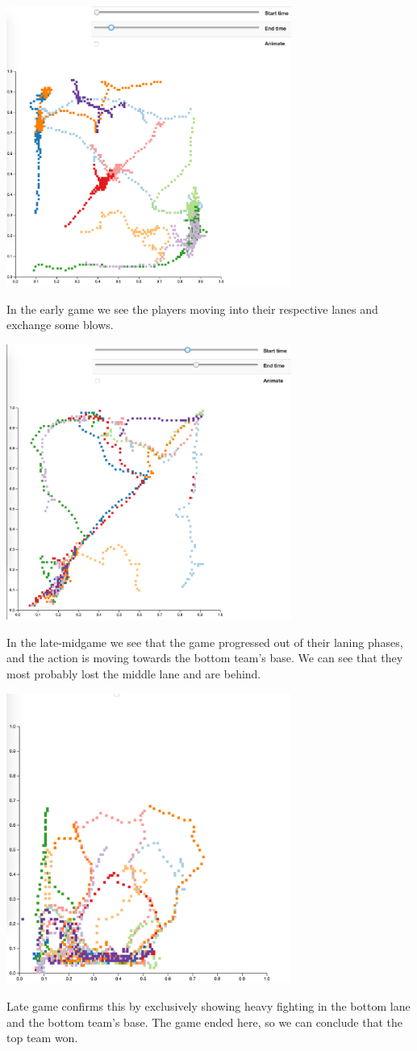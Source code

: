 \includegraphics[width=0.7\textwidth]{earlygame}

In the early game we see the players moving into their respective lanes and exchange some blows.

\includegraphics[width=0.7\textwidth]{midgame}

In the late-midgame we see that the game progressed out of their laning phases, and the action is moving towards the bottom team's base. We can see that they most probably lost the middle lane and are behind.

\includegraphics[width=0.7\textwidth]{lategame}

Late game confirms this by exclusively showing heavy fighting in the bottom lane and the bottom team's base. The game ended here, so we can conclude that the top team won.

